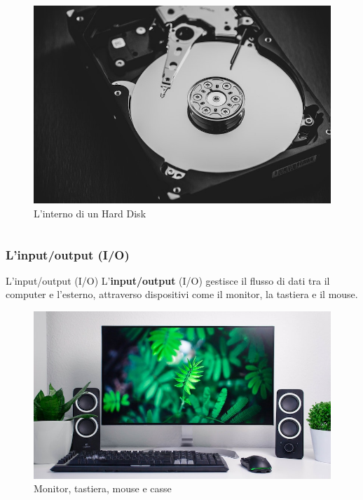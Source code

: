 \begin{frame}
\begin{columns}
		\begin{figure}[!htbp] 
			\centering
			\includegraphics[width=0.68\linewidth]{images/3_architetture/memory_hdd.jpg}
			\caption{L'interno di un Hard Disk}
			\label{fig:architectures_memory_hdd}
		\end{figure}
		
	\end{columns}
	
\end{frame}


\subsubsection[L'input/output (I/O)]{L'input/output (I/O)}
\begin{frame}
	
	\begin{block}{L'input/output (I/O)} 
		L'\textbf{input/output} (I/O) gestisce il flusso di dati tra il computer e l'esterno, attraverso dispositivi come il monitor, la tastiera e il mouse.
	\end{block}
	
	\begin{figure}[!htbp] 
		\centering
		\includegraphics[width=0.8\linewidth]{images/3_architetture/io.jpg}
		\caption{Monitor, tastiera, mouse e casse}
		\label{fig:architectures_io}
	\end{figure}
	 
\end{frame}


